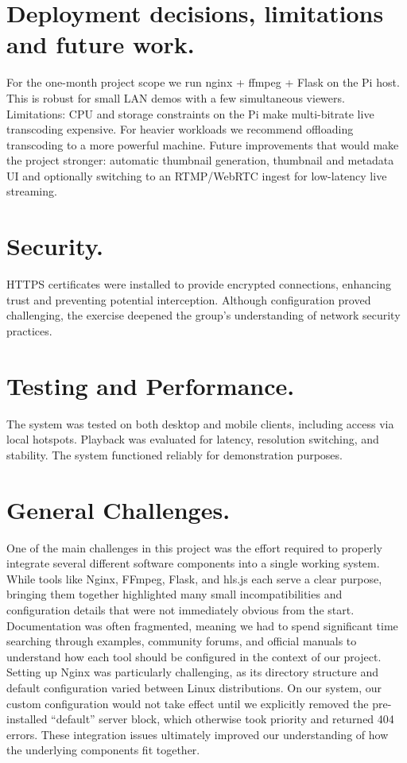 \documentclass[11pt]{report}
\begin{document}
\section{Deployment decisions, limitations and future work.}
For the one-month project scope we run nginx + ffmpeg + Flask on the Pi host. This is robust for small LAN demos with a few simultaneous viewers. Limitations: CPU and storage constraints on the Pi make multi-bitrate live transcoding expensive. For heavier workloads we recommend offloading transcoding to a more powerful machine. Future improvements that would make the project stronger: automatic thumbnail generation, thumbnail and metadata UI and optionally switching to an RTMP/WebRTC ingest for low-latency live streaming.

\section{Security.} HTTPS certificates were installed to provide encrypted connections, enhancing trust and preventing potential interception. Although configuration proved challenging, the exercise deepened the group’s understanding of network security practices.

\section{Testing and Performance.} The system was tested on both desktop and mobile clients, including access via local hotspots. Playback was evaluated for latency, resolution switching, and stability. The system functioned reliably for demonstration purposes.

\section{General Challenges.}
One of the main challenges in this project was the effort required to properly integrate several different software components into a single working system. While tools like Nginx, FFmpeg, Flask, and hls.js each serve a clear purpose, bringing them together highlighted many small incompatibilities and configuration details that were not immediately obvious from the start. Documentation was often fragmented, meaning we had to spend significant time searching through examples, community forums, and official manuals to understand how each tool should be configured in the context of our project. Setting up Nginx was particularly challenging, as its directory structure and default configuration varied between Linux distributions. On our system, our custom configuration would not take effect until we explicitly removed the pre-installed “default” server block, which otherwise took priority and returned 404 errors. These integration issues ultimately improved our understanding of how the underlying components fit together.
\end{document}
